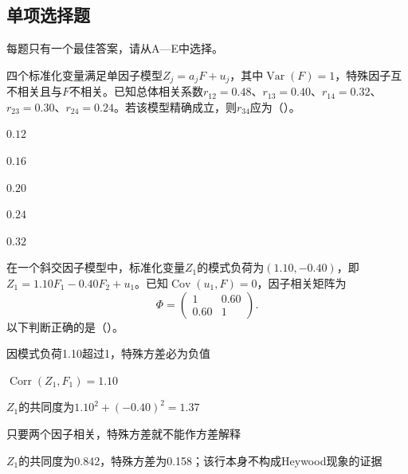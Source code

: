 \subsection{单项选择题}
每题只有一个最佳答案，请从A—E中选择。

\par\noindent\begin{minipage}{\linewidth}
四个标准化变量满足单因子模型$Z_j=a_jF+u_j$，其中$\operatorname{Var}(F)=1$，特殊因子互不相关且与$F$不相关。已知总体相关系数$r_{12}=0.48$、$r_{13}=0.40$、$r_{14}=0.32$、$r_{23}=0.30$、$r_{24}=0.24$。若该模型精确成立，则$r_{34}$应为（\quad）。
\begin{choices}
\item $0.12$
\item $0.16$
\item $0.20$
\item $0.24$
\item $0.32$
\end{choices}
\end{minipage}\par\medskip

\par\noindent\begin{minipage}{\linewidth}
在一个斜交因子模型中，标准化变量$Z_1$的模式负荷为$(1.10,-0.40)$，即$Z_1=1.10F_1-0.40F_2+u_1$。已知$\operatorname{Cov}(u_1,F)=0$，因子相关矩阵为\[\Phi=\begin{pmatrix}1&0.60\\0.60&1\end{pmatrix}.\]以下判断正确的是（\quad）。
\begin{choices}
\item 因模式负荷1.10超过1，特殊方差必为负值
\item $\operatorname{Corr}(Z_1,F_1)=1.10$
\item $Z_1$的共同度为$1.10^2+(-0.40)^2=1.37$
\item 只要两个因子相关，特殊方差就不能作方差解释
\item $Z_1$的共同度为0.842，特殊方差为0.158；该行本身不构成Heywood现象的证据
\end{choices}
\end{minipage}\par\medskip

